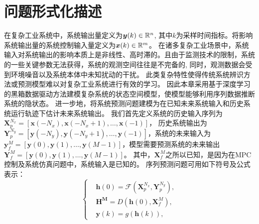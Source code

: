 \section{问题形式化描述}
\label{sec:formulate}
在复杂工业系统中，系统输出量定义为$\boldsymbol y(k) \in \mathbb{R}^n$,
其中$k$为采样时间指标。将影响系统输出量的系统控制输入量定义为$\boldsymbol x(k)\in \mathbb{R}^m$。
在诸多复杂工业场景中，系统输入对系统输出的影响本质上是非线性、高时滞的。且由于监测技术的限制，系统的一些关键参数无法获得，系统的观测空间往往是不完备的,
同时，观测数据会受到环境噪音以及系统本体中未知扰动的干扰。
此类复杂特性使得传统系统辨识方法\cite{larsson2002identification}或预测模型\cite{box2015time}难以对复杂工业系统进行有效的学习。
因此本章采用基于深度学习的黑箱数据驱动方法建模复杂系统的状态空间模型，使模型能够利用序列数据推断系统的隐状态。
进一步地，将系统预测问题建模为在已知未来系统输入和历史系统运行轨迹下估计未来系统输出。
我们首先定义系统的历史输入序列为 $\boldsymbol X_p^{N_x}=[\boldsymbol x(-N_x),\boldsymbol x(-N_x+1), \dots, \boldsymbol x(-1)]$， 历史系统输出为 
$\boldsymbol Y_p^{N_y}=[\boldsymbol y(-N_y),\boldsymbol y(-N_y+1),\dots, \boldsymbol y(-1)]$，系统的未来输入为 $\boldsymbol y_f^{M}=[\boldsymbol y(0),\boldsymbol y(1),\dots,\boldsymbol y(M-1)]$，模型需要预测系统的未来输出$\boldsymbol Y_f^{M}=[\boldsymbol y(0),\boldsymbol y(1),\dots,\boldsymbol y(M-1)]$。
其中，$\boldsymbol X_f^{M}$之所以已知，是因为在MPC控制及系统仿真问题中，系统输入是已知的。
序列预测问题可用如下符号及公式表示：
\begin{equation}
\label{equ:discrete_seq2seq}
\left\{
\begin{aligned}
&\boldsymbol{h}(0) = \mathcal{F}(\boldsymbol X_p^{N_x}, \boldsymbol{Y}_p^{N_y}), \\
&\boldsymbol{H^M} = D(\boldsymbol{h}(0), \boldsymbol {X}_f^{M}),\\
&\boldsymbol{y}(k) = g(\boldsymbol{h}(k)),
\end{aligned}
\right.
\end{equation}

